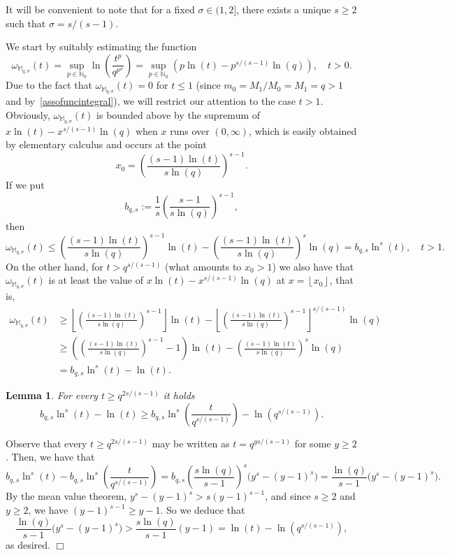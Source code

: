 \documentclass[11pt,a4paper]{article}
\theoremstyle{plain}
\newtheorem{lemma}[theo]{Lemma}
\theoremstyle{definition}
\newenvironment{proof1}{\medskip\par\noindent{\bf Proof.}}{\hfill $\Box$
\medskip\par}
\newcommand{\flo}[1]{\left\lfloor {#1} \right\rfloor}
\def\o{\omega}
\def\Ms{{\mathbb{M}}_{q,\sigma}}
\begin{document}
It will be convenient to note that for a fixed $\sigma\in(1,2]$, there exists a unique $s\ge 2$ such that $\sigma=s/(s-1)$.

We start by suitably estimating the function
$$\o_{\Ms}(t)= \sup_{p\in\mathbb{N}_0} \ln\left(\frac{t^{p}}{q^{p^\sigma}}\right)=\sup_{p\in\mathbb{N}_0} (p\ln(t)-p^{s/(s-1)}\ln(q)),\quad t>0.
$$
Due to the fact that $\o_{\Ms}(t)=0$ for $t\leq1$ (since $m_0=M_1/M_0=M_1=q>1$ and by~\eqref{assofuncintegral}), we will restrict our attention to the case $t>1$.
Obviously, $\o_{\Ms}(t)$ is bounded above by the supremum of $x\ln(t)-x^{s/(s-1)}\ln(q)$ when $x$ runs over $(0,\infty)$, which is easily obtained by elementary calculus and occurs at the point
$$
x_0=\left(\frac{(s-1)\ln(t)}{s\ln(q)}\right)^{s-1}.
$$
If we put
\begin{equation}\label{eq.def.b_qs}
b_{q,s}:=\frac{1}{s}\left(\frac{s-1}{s\ln(q)}\right)^{s-1},
\end{equation}
then
\begin{equation}\label{o_Ms_upbound}
	\o_{\Ms}(t)\leq \left(\frac{(s-1)\ln(t)}{s\ln(q)}\right)^{s-1}\ln(t)- \left(\frac{(s-1)\ln(t)}{s\ln(q)}\right)^{s}\ln(q)=b_{q,s} \ln^s(t),\quad t>1.
\end{equation}
On the other hand, for $t> q^{s/(s-1)} $ (what amounts to $x_0>1$) we also have that $\o_{\Ms}(t)$ is at least the value of $x\ln(t)-x^{s/(s-1)}\ln(q)$ at $x=\flo{x_0}$, that is,
\begin{align}
\o_{\Ms}(t)&\ge \flo{\left(\frac{(s-1)\ln(t)}{s\ln(q)}\right)^{s-1}}\ln(t)- \flo{\left(\frac{(s-1)\ln(t)}{s\ln(q)}\right)^{s-1}}^{s/(s-1)} \ln(q)\nonumber\\
&\ge \left(\left(\frac{(s-1)\ln(t)}{s\ln(q)}\right)^{s-1}-1\right)\ln(t)- \left(\frac{(s-1)\ln(t)}{s\ln(q)}\right)^s\ln(q)\nonumber\\
&=b_{q,s} \ln^s(t)-\ln(t).\label{o_Ms_interbound}
\end{align}

\begin{lemma}
For every $t\ge q^{2s/(s-1)}$ it holds
\begin{equation}\label{eq.EstimateOmegaQSigma}
b_{q,s}\ln^s(t)-\ln(t)\ge b_{q,s}\ln^s\left(\frac{t}{q^{s/(s-1)}}\right)- \ln\left(q^{s/(s-1)}\right).
\end{equation}
\end{lemma}
\begin{proof1}
Observe that every $t\ge q^{2s/(s-1)}$ may be written as $t=q^{ys/(s-1)}$ for some $y\ge 2$. Then, we have that
\begin{equation*}
b_{q,s}\ln^s(t)-b_{q,s}\ln^s\left(\frac{t}{q^{s/(s-1)}}\right)=
b_{q,s}\left(\frac{s\ln(q)}{s-1}\right)^s\big(y^s-(y-1)^s\big)=
\frac{\ln(q)}{s-1}\big(y^s-(y-1)^s\big).
\end{equation*}
By the mean value theorem, $y^s-(y-1)^s>s(y-1)^{s-1}$, and since $s\ge 2$ and $y\ge 2$, we have $(y-1)^{s-1}\ge y-1$. So we deduce that
$$
\frac{\ln(q)}{s-1}\big(y^s-(y-1)^s\big)>\frac{s\ln(q)}{s-1}(y-1)=
\ln(t)-\ln\left(q^{s/(s-1)}\right),
$$
as desired.
\end{proof1}
\end{document}
